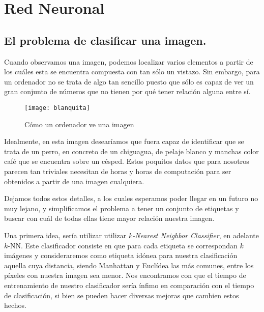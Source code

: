 
\chapter{Red Neuronal}
\section{El problema de clasificar una imagen.}

Cuando observamos una imagen, podemos localizar varios elementos a partir de los cuáles esta se encuentra compuesta con tan sólo un vistazo. Sin embargo, para un ordenador no se trata de algo tan sencillo puesto que sólo es capaz de ver un gran conjunto de números que no tienen por qué tener relación alguna entre sí.\newline

\begin{figure}[htpb]
  \centering
  \texttt{[image: blanquita]}
  \caption{Cómo un ordenador ve una imagen}
  \label{fig:blanquita}
\end{figure}

Idealmente, en esta imagen desearíamos que fuera capaz de identificar que se trata de un perro, en concreto de un chiguagua, de pelaje blanco y manchas color café que se encuentra sobre un césped. Estos poquitos datos que para nosotros parecen tan triviales necesitan de horas y horas de computación para ser obtenidos a partir de una imagen cualquiera.\newline

Dejamos todos estos detalles, a los cuales esperamos poder llegar en un futuro no muy lejano, y simplificamos el problema a tener un conjunto de etiquetas y buscar con cuál de todas ellas tiene mayor relación nuestra imagen.\newline

Una primera idea, sería utilizar utilizar \emph{$k$-Nearest Neighbor Classifier}, en adelante $k$-NN. Este clasificador consiste en que para cada etiqueta se correspondan $k$ imágenes y consideraremos como etiqueta idónea para nuestra clasificación aquella cuya distancia, siendo Manhattan y Euclídea las más comunes, entre los píxeles con nuestra imagen sea menor. Nos encontramos con que el tiempo de entrenamiento de nuestro clasificador sería ínfimo en comparación con el tiempo de clasificación, si bien se pueden hacer diversas mejoras que cambien estos hechos. \newline

